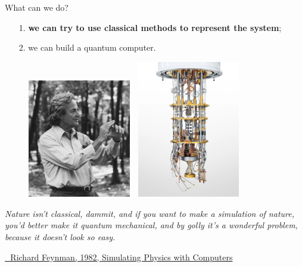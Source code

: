 \documentclass[8pt, xcolor={svgnames}, hyperref={linkcolor=amethyst}]{beamer}
\begin{document}
\begin{frame}{What can we do?}
\begin{itemize}[noitemsep]
\item[1.] \textbf{\textcolor{amethyst}{we can try to use classical methods to represent the system}};
\item[2.] we can build a quantum computer.
\end{itemize}
\begin{figure}
   \includegraphics[width=0.4\textwidth, height=0.55\textheight]{figures/feynmann.jpg}%
   $\,\,$ 
   \includegraphics[width=0.4\textwidth, height=0.55\textheight]{figures/qcomp.png}
\end{figure}

\small
\textit{Nature isn't classical, dammit, and if you want to make a simulation of nature, 
you'd better make it quantum mechanical, and by golly it's a wonderful problem, 
because it doesn't look so easy.} 

\href{https://link.springer.com/article/10.1007/BF02650179}{\faBook\,\, Richard Feynman, 1982, Simulating Physics with Computers}
\end{frame}
\end{document}
